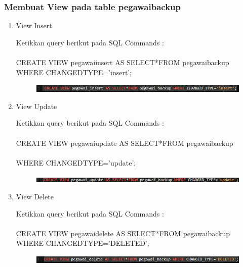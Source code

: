 \documentclass[12pt, times new roman, a4paper]{report}
\begin{document}
\subsubsection{Membuat View pada table pegawai\textunderscore backup}
\begin{enumerate}
\item View Insert
\par Ketikkan query berikut pada SQL Commands :\\
\\
 CREATE VIEW pegawai\textunderscore insert AS SELECT*FROM pegawai\textunderscore backup\\
  WHERE CHANGED\textunderscore TYPE='insert';
\begin{figure}[h]
	\centering
		\includegraphics[scale=0.9]{gambar/20}
\end{figure}

\newpage
\item View Update
\par Ketikkan query berikut pada SQL Commands :\\
\\
CREATE VIEW pegawai\textunderscore update AS SELECT*FROM pegawai\textunderscore backup\\ 
\\
WHERE CHANGED\textunderscore TYPE='update';
\begin{figure}[h]
	\centering
		\includegraphics[scale=1]{gambar/21}
\end{figure}

\item View Delete
\par Ketikkan query berikut pada SQL Commands :\\
\\
CREATE VIEW pegawai\textunderscore delete AS SELECT*FROM pegawai\textunderscore backup WHERE CHANGED\textunderscore TYPE='DELETED';
\begin{figure}[h]
	\centering
		\includegraphics[scale=1]{gambar/22}
\end{figure}
\end{enumerate}

\newpage
\end{document}
